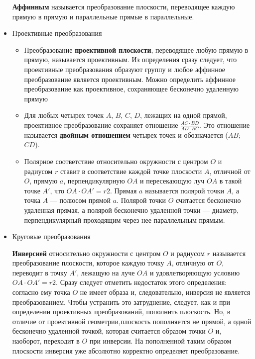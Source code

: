 \documentclass[]{article}
\begin{document}
\begin{itemize}[noitemsep]
		\textbf{Аффинным} называется преобразование плоскости, переводящее каждую прямую в прямую и параллельные прямые в параллельные.
		\item Проективные преобразования
		\begin{itemize}[noitemsep]
			\item Преобразование \textbf{проективной плоскости}, переводящее любую прямую в прямую, называется проективным. Из определения сразу следует, что проективные преобразования образуют группу
			и любое аффинное преобразование является проективным. Можно определить аффинное преобразование как проективное, сохраняющее бесконечно удаленную прямую
			\item Для любых четырех точек $A$, $B$, $C$, $D$, лежащих на одной
			прямой, проективное преобразование сохраняет отношение $\frac{AC \cdot BD}{AD \cdot BC}$. Это отношение называется \textbf{двойным отношением} четырех точек и обозначается ($AB$; $CD$).
			\item Полярное соответствие относительно окружности с центром $O$ и радиусом $r$ ставит в соответствие каждой точке
			плоскости $A$, отличной от $O$, прямую $a$, перпендикулярную $OA$ и пересекающую луч $OA$ в такой точке $A'$, что $OA \cdot OA' = r2$. Прямая $a$ называется полярой точки $A$, а точка $A$ — полюсом прямой $a$. Полярой точки $O$ считается бесконечно удаленная прямая, а полярой бесконечно удаленной точки — диаметр, перпендикулярный проходящим через нее параллельным прямым. 
		\end{itemize}	
		\item Круговые преобразования
		
		\textbf{Инверсией} относительно окружности с центром $O$ и радиусом $r$ называется преобразование плоскости, которое каждую точку $A$, отличную от $O$, переводит в точку $A'$, лежащую на луче $OA$ и удовлетворяющую условию $OA \cdot OA' = r2$. Сразу следует отметить недостаток этого определения: согласно ему точка $O$ не имеет образа и, следовательно, инверсия не является преобразованием. Чтобы устранить это затруднение, следует, как и при определении проективных преобразований, пополнить плоскость. Но, в отличие от проективной геометрии,плоскость пополняется не прямой, а одной бесконечно удаленной точкой, которая считается образом точки $O$ и, наоборот, переходит в $O$ при инверсии. На пополненной таким образом плоскости инверсия уже абсолютно корректно определяет преобразование.
		
	\end{itemize}	
\end{document}
